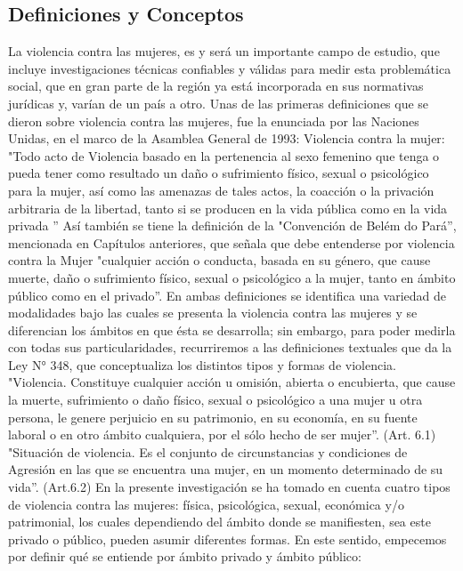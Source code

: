 \documentclass[11pt,letter]{article}
\begin{document}
\subsection{Definiciones y Conceptos}
La violencia contra las mujeres, es y será un importante campo de estudio, que incluye investigaciones técnicas confiables y válidas para medir esta problemática social, que en gran parte de la región ya está incorporada en sus normativas jurídicas y, varían de un país a otro.
Unas de las primeras definiciones que se dieron sobre violencia contra las mujeres, fue la enunciada por las Naciones Unidas, en el marco de la Asamblea General de 1993:
Violencia contra la mujer: "Todo acto de Violencia basado en la pertenencia al sexo femenino que tenga o pueda tener como resultado un daño o sufrimiento físico, sexual o psicológico para la mujer, así como las amenazas de tales actos, la coacción o la privación arbitraria de la libertad, tanto si se producen en la vida pública como en la vida privada ''
Así también se tiene la definición de la "Convención de Belém do Pará'', mencionada en Capítulos anteriores, que señala que debe entenderse por violencia contra la Mujer "cualquier acción o conducta, basada en su género,
que cause muerte, daño o sufrimiento físico, sexual o psicológico a la mujer, tanto en ámbito público como en el privado''.
En ambas definiciones se identifica una variedad de modalidades bajo las cuales se presenta la violencia contra las mujeres y se diferencian los ámbitos en que ésta se desarrolla; sin embargo, para poder medirla con todas sus particularidades, recurriremos a las definiciones textuales que da la Ley N° 348, que conceptualiza los distintos tipos y formas de violencia.
"Violencia. Constituye cualquier acción u omisión, abierta o encubierta, que cause la muerte, sufrimiento o daño físico, sexual o psicológico a una mujer u otra persona, le genere perjuicio en su patrimonio, en su economía, en su fuente laboral o en otro ámbito cualquiera, por el sólo hecho de ser mujer''. (Art. 6.1)
"Situación de violencia. Es el conjunto de circunstancias y condiciones de Agresión en las que se encuentra una mujer, en un momento determinado de su vida''. (Art.6.2)
En la presente investigación se ha tomado en cuenta cuatro tipos de violencia contra las mujeres: física, psicológica, sexual, económica y/o patrimonial, los cuales dependiendo del ámbito donde se manifiesten, sea este privado o público, pueden asumir diferentes formas. En este sentido, empecemos por definir qué se entiende por ámbito privado y ámbito público:
\end{document}
